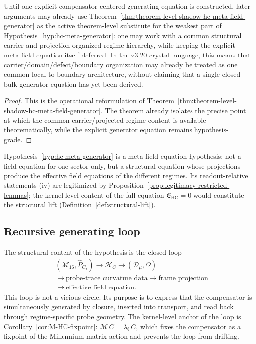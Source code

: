 \begin{corollary}
\label{cor:operational-reading-hypothesis-74-v320}
Until one explicit compensator-centered generating equation is constructed, later arguments may already use Theorem~\ref{thm:theorem-level-shadow-hc-meta-field-generator} as the active theorem-level substitute for the weakest part of Hypothesis~\ref{hyp:hc-meta-generator}: one may work with a common structural carrier and projection-organized regime hierarchy, while keeping the explicit meta-field equation itself deferred. In the v3.20 crystal language, this means that carrier/domain/defect/boundary organization may already be treated as one common local-to-boundary architecture, without claiming that a single closed bulk generator equation has yet been derived.
\end{corollary}

\begin{proof}
This is the operational reformulation of Theorem~\ref{thm:theorem-level-shadow-hc-meta-field-generator}. The theorem already isolates the precise point at which the common-carrier/projected-regime content is available theorematically, while the explicit generator equation remains hypothesis-grade.
\end{proof}


\begin{remark}
Hypothesis~\ref{hyp:hc-meta-generator} is a meta-field-equation
hypothesis: not a field equation for one sector only, but a structural
equation whose projections produce the effective field equations of the
different regimes. Its readout-relative statements (iv) are
legitimized by Proposition~\ref{prop:legitimacy-restricted-lemmas};
the kernel-level content of the full equation $\mathfrak{E}_{\mathrm{HC}} = 0$
would constitute the structural lift
(Definition~\ref{def:structural-lift}).
\end{remark}

\subsection*{Recursive generating loop}

The structural content of the hypothesis is the closed loop
\[
\begin{aligned}
&(\mathcal{M}_{16},\hat{P}_{C_7}) \longrightarrow \mathcal{H}_C \longrightarrow (\mathcal{D}_\mu,\Omega)\\
&\longrightarrow \text{probe-trace curvature data} \longrightarrow \text{frame projection}\\
&\longrightarrow \text{effective field equation}.
\end{aligned}
\]
This loop is not a vicious circle. Its purpose is to express that the
compensator is simultaneously generated by closure, inserted into
transport, and read back through regime-specific probe geometry.
The kernel-level anchor of the loop is
Corollary~\ref{cor:M-HC-fixpoint}: $\mathcal{M}\,C = \lambda_0\,C$,
which fixes the compensator as a fixpoint of the Millennium-matrix
action and prevents the loop from drifting.

